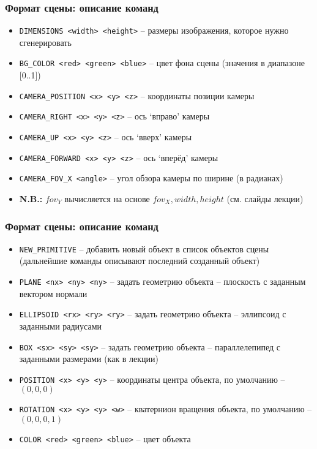\documentclass[10pt]{beamer}
\begin{document}
\begin{frame}
\frametitle{Формат сцены: описание команд}
\begin{itemize}
\item \texttt{DIMENSIONS <width> <height>} -- размеры изображения, которое нужно сгенерировать
\item \texttt{BG\_COLOR <red> <green> <blue>} -- цвет фона сцены (значения в диапазоне [0..1])
\item \texttt{CAMERA\_POSITION <x> <y> <z>} -- координаты позиции камеры
\item \texttt{CAMERA\_RIGHT <x> <y> <z>} -- ось `вправо' камеры
\item \texttt{CAMERA\_UP <x> <y> <z>} -- ось `вверх' камеры
\item \texttt{CAMERA\_FORWARD <x> <y> <z>} -- ось `вперёд' камеры
\item \texttt{CAMERA\_FOV\_X <angle>} -- угол обзора камеры по ширине (в радианах)
\item \alert{\textbf{N.B.:}} \begin{math}fov_Y\end{math} вычисляется на основе \begin{math}fov_X, width, height\end{math} (см. слайды лекции)
\end{itemize}
\end{frame}

\begin{frame}
\frametitle{Формат сцены: описание команд}
\begin{itemize}
\item \texttt{NEW\_PRIMITIVE} -- добавить новый объект в список объектов сцены (дальнейшие команды описывают последний созданный объект)
\item \texttt{PLANE <nx> <ny> <ny>} -- задать геометрию объекта -- плоскость с заданным вектором нормали
\item \texttt{ELLIPSOID <rx> <ry> <ry>} -- задать геометрию объекта -- эллипсоид с заданными радиусами
\item \texttt{BOX <sx> <sy> <sy>} -- задать геометрию объекта -- параллелепипед с заданными размерами (как в лекции)
\item \texttt{POSITION <x> <y> <y>} -- координаты центра объекта, по умолчанию -- \begin{math}(0, 0, 0)\end{math}
\item \texttt{ROTATION <x> <y> <y> <w>} -- кватернион вращения объекта, по умолчанию -- \begin{math}(0, 0, 0, 1)\end{math}
\item \texttt{COLOR <red> <green> <blue>} -- цвет объекта
\end{itemize}
\end{frame}
\end{document}
